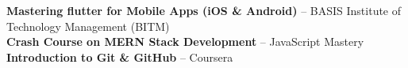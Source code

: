 

 \textbf{Mastering flutter for Mobile Apps (iOS \& Android)} – BASIS Institute of Technology Management (BITM) \\
 \vspace{1mm}
 \textbf{Crash Course on MERN Stack Development} – JavaScript Mastery \\
 \vspace{1mm}
 \textbf{Introduction to Git \& GitHub } – Coursera \\
